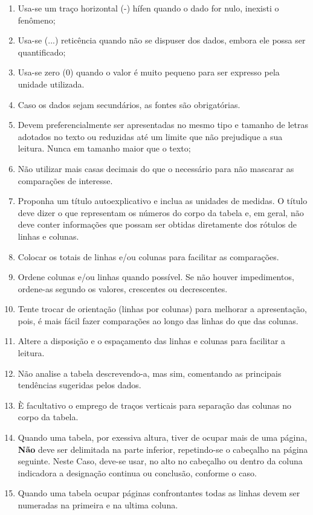 \begin{enumerate}
\item Usa-se um traço horizontal (-) hífen quando o dado for nulo, inexisti o fenômeno; 
\item Usa-se (...) reticência quando não se dispuser dos dados,
embora ele possa ser quantificado; 
\item Usa-se zero (0) quando o
valor é muito pequeno para ser expresso pela unidade utilizada.
\item Caso os dados sejam secundários, as fontes são obrigatórias.
\item Devem preferencialmente ser apresentadas no mesmo tipo e tamanho de letras adotados no texto ou reduzidas até um limite que não prejudique a sua leitura. Nunca em tamanho maior que o texto;
\item Não utilizar mais casas decimais do que o necessário para
não mascarar as comparações de interesse. 
\item Proponha um título
autoexplicativo e inclua as unidades de medidas. O título deve
dizer o que representam os números do corpo da tabela e, em geral,
não deve conter informações que possam ser obtidas diretamente dos
rótulos de linhas e colunas. 
\item Colocar os totais de linhas
e/ou colunas para facilitar as comparações. 
\item Ordene colunas
e/ou linhas quando possível. Se não houver impedimentos, ordene-as
segundo os valores, crescentes ou decrescentes. 
\item Tente trocar
de orientação (linhas por colunas) para melhorar a apresentação,
pois, é mais fácil fazer comparações ao longo das linhas do que
das colunas. 
\item Altere a disposição e o espaçamento das linhas
e colunas para facilitar a leitura. 
\item Não analise a tabela
descrevendo-a, mas sim, comentando as principais tendências
sugeridas pelos dados. 
\item È facultativo o emprego de traços
verticais para separação das colunas no corpo da tabela. 
\item
Quando uma tabela, por exessiva altura, tiver de ocupar mais de
uma página, 
\textbf{Não} deve ser delimitada na parte inferior,
repetindo-se o cabeçalho na página seguinte. Neste Caso, deve-se
usar, no alto no cabeçalho ou dentro da coluna indicadora a
designação continua ou conclusão, conforme o caso. 
\item Quando
uma tabela ocupar páginas confrontantes todas as linhas devem ser
numeradas na primeira e na ultima coluna. 

\end{enumerate}
